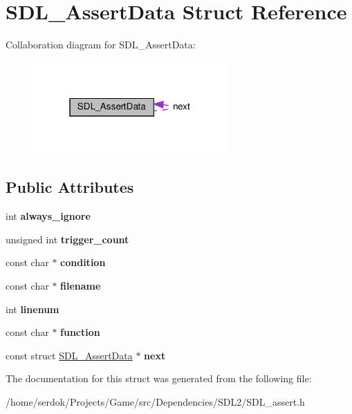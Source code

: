 \hypertarget{structSDL__AssertData}{}\section{S\+D\+L\+\_\+\+Assert\+Data Struct Reference}
\label{structSDL__AssertData}


Collaboration diagram for S\+D\+L\+\_\+\+Assert\+Data\+:\nopagebreak
\begin{figure}[H]
\begin{center}
\leavevmode
\includegraphics[width=211pt]{structSDL__AssertData__coll__graph}
\end{center}
\end{figure}
\subsection*{Public Attributes}
\begin{DoxyCompactItemize}
\item 
\mbox{\label{structSDL__AssertData_a825e1c7772fe24afad33d0afc42cf04c}} 
int {\bfseries always\+\_\+ignore}
\item 
\mbox{\label{structSDL__AssertData_a230bbcc2d115aab04cf817773e08eb5b}} 
unsigned int {\bfseries trigger\+\_\+count}
\item 
\mbox{\label{structSDL__AssertData_aec6d372462fa8c94a9d04c1168cd38c9}} 
const char $\ast$ {\bfseries condition}
\item 
\mbox{\label{structSDL__AssertData_acf27f593e6a436386d2cbcf826cf1ef7}} 
const char $\ast$ {\bfseries filename}
\item 
\mbox{\label{structSDL__AssertData_ad026d8573970d2402230d5fa3c550b0f}} 
int {\bfseries linenum}
\item 
\mbox{\label{structSDL__AssertData_a4913c57d4affb813feea82fc5f48a25c}} 
const char $\ast$ {\bfseries function}
\item 
\mbox{\label{structSDL__AssertData_a2081dcf06dce4df497e423bccddfc099}} 
const struct \hyperlink{structSDL__AssertData}{S\+D\+L\+\_\+\+Assert\+Data} $\ast$ {\bfseries next}
\end{DoxyCompactItemize}


The documentation for this struct was generated from the following file\+:\begin{DoxyCompactItemize}
\item 
/home/serdok/\+Projects/\+Game/src/\+Dependencies/\+S\+D\+L2/S\+D\+L\+\_\+assert.\+h\end{DoxyCompactItemize}
